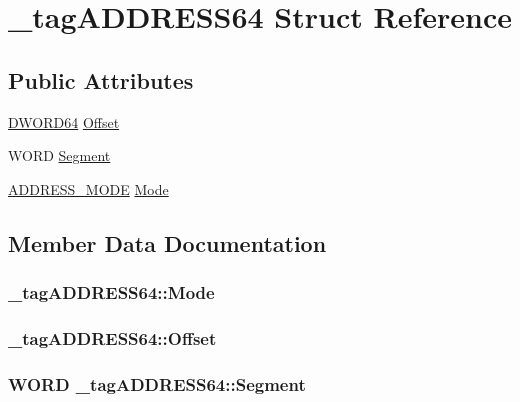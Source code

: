 \hypertarget{struct__tag_a_d_d_r_e_s_s64}{\section{\-\_\-tag\-A\-D\-D\-R\-E\-S\-S64 Struct Reference}
\label{struct__tag_a_d_d_r_e_s_s64}
}
\subsection*{Public Attributes}
\begin{DoxyCompactItemize}
\item 
\hyperlink{_stack_walker_8h_a97fb241c597b99bcb965858f53cacac4}{D\-W\-O\-R\-D64} \hyperlink{struct__tag_a_d_d_r_e_s_s64_aeaa6b0d173d45003450b921601df6543}{Offset}
\item 
W\-O\-R\-D \hyperlink{struct__tag_a_d_d_r_e_s_s64_a69f23702d27f4f87c2dc1bc357177c52}{Segment}
\item 
\hyperlink{_stack_walker_8cpp_a7ccaea3b5eded8c0bc63d2f6766a216a}{A\-D\-D\-R\-E\-S\-S\-\_\-\-M\-O\-D\-E} \hyperlink{struct__tag_a_d_d_r_e_s_s64_ad00383c28d4929ecaa9474315e136177}{Mode}
\end{DoxyCompactItemize}


\subsection{Member Data Documentation}
\hypertarget{struct__tag_a_d_d_r_e_s_s64_ad00383c28d4929ecaa9474315e136177}{
\subsubsection[{Mode}]{ \-\_\-tag\-A\-D\-D\-R\-E\-S\-S64\-::\-Mode}}\label{struct__tag_a_d_d_r_e_s_s64_ad00383c28d4929ecaa9474315e136177}
\hypertarget{struct__tag_a_d_d_r_e_s_s64_aeaa6b0d173d45003450b921601df6543}{
\subsubsection[{Offset}]{ \-\_\-tag\-A\-D\-D\-R\-E\-S\-S64\-::\-Offset}}\label{struct__tag_a_d_d_r_e_s_s64_aeaa6b0d173d45003450b921601df6543}
\hypertarget{struct__tag_a_d_d_r_e_s_s64_a69f23702d27f4f87c2dc1bc357177c52}{
\subsubsection[{Segment}]{\setlength{\rightskip}{0pt plus 5cm}W\-O\-R\-D \-\_\-tag\-A\-D\-D\-R\-E\-S\-S64\-::\-Segment}}\label{struct__tag_a_d_d_r_e_s_s64_a69f23702d27f4f87c2dc1bc357177c52}


